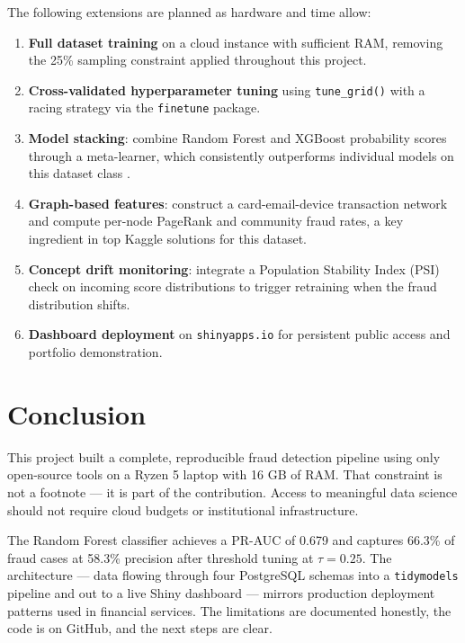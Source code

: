 \documentclass[12pt, a4paper]{article}
\begin{document}
The following extensions are planned as hardware and time allow:

\begin{enumerate}
    \item \textbf{Full dataset training} on a cloud instance with sufficient RAM,
    removing the 25\% sampling constraint applied throughout this project.
    \item \textbf{Cross-validated hyperparameter tuning} using \texttt{tune\_grid()}
    with a racing strategy via the \texttt{finetune} package.
    \item \textbf{Model stacking}: combine Random Forest and XGBoost probability
    scores through a meta-learner, which consistently outperforms individual models
    on this dataset class \cite{leborgne2022}.
    \item \textbf{Graph-based features}: construct a card-email-device transaction
    network and compute per-node PageRank and community fraud rates, a key ingredient
    in top Kaggle solutions for this dataset.
    \item \textbf{Concept drift monitoring}: integrate a Population Stability Index
    (PSI) check on incoming score distributions to trigger retraining when the fraud
    distribution shifts.
    \item \textbf{Dashboard deployment} on \texttt{shinyapps.io} for persistent
    public access and portfolio demonstration.
\end{enumerate}

\section{Conclusion}

This project built a complete, reproducible fraud detection pipeline using only
open-source tools on a Ryzen 5 laptop with 16 GB of RAM. That constraint is not a
footnote --- it is part of the contribution. Access to meaningful data science
should not require cloud budgets or institutional infrastructure.

The Random Forest classifier achieves a PR-AUC of 0.679 and captures 66.3\% of
fraud cases at 58.3\% precision after threshold tuning at $\tau = 0.25$. The
architecture --- data flowing through four PostgreSQL schemas into a
\texttt{tidymodels} pipeline and out to a live Shiny dashboard --- mirrors
production deployment patterns used in financial services. The limitations are
documented honestly, the code is on GitHub, and the next steps are clear.
\end{document}
